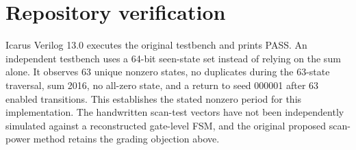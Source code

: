 \documentclass[11pt,a4paper]{article}
\begin{document}
\section{Repository verification}
Icarus Verilog 13.0 executes the original testbench and prints PASS. An independent testbench uses a 64-bit seen-state set instead of relying on the sum alone. It observes 63 unique nonzero states, no duplicates during the 63-state traversal, sum 2016, no all-zero state, and a return to seed 000001 after 63 enabled transitions. This establishes the stated nonzero period for this implementation. The handwritten scan-test vectors have not been independently simulated against a reconstructed gate-level FSM, and the original proposed scan-power method retains the grading objection above.
\end{document}
